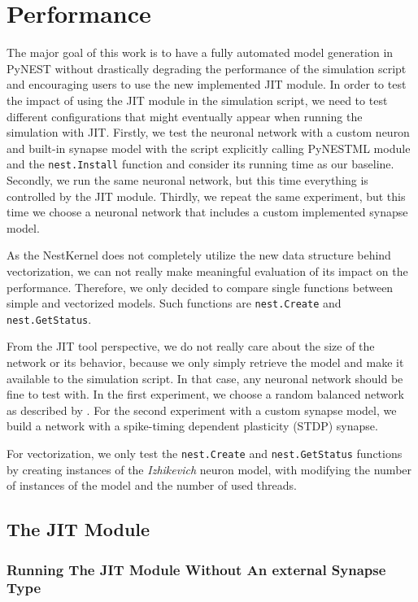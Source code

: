\chapter{Performance}
 \label{chap:perf}
 
 The major goal of this work is to have a fully automated model generation in PyNEST without drastically degrading the performance of the simulation script and encouraging users to use the new implemented JIT module. In order to test the impact of using the JIT module in the simulation script, we need to test different configurations that might eventually appear when running the simulation with JIT. Firstly, we test the neuronal network with a custom neuron and built-in synapse model with the script explicitly calling PyNESTML module and the \texttt{nest.Install} function and  consider its running time as our baseline. Secondly, we run the same neuronal network, but this time everything is controlled by the JIT module. Thirdly, we repeat the same experiment, but this time we choose a neuronal network that includes a custom implemented synapse model.
 
 As the NestKernel does not completely utilize the new data structure behind vectorization, we can not really make meaningful evaluation of its impact on the performance. Therefore, we only decided to compare single functions between simple and vectorized models. Such functions are \texttt{nest.Create} and \texttt{nest.GetStatus}.
 
 From the JIT tool perspective, we do not really care about the size of the network or its behavior, because we only simply retrieve the model and make it available to the simulation script. In that case, any neuronal network should be fine to test with. In the first experiment, we choose a random balanced network as  described by \citep{brunel2000dynamics}. For the second experiment with a custom synapse model, we build a network with a spike-timing dependent plasticity (STDP) synapse.
 
 
 For vectorization, we only test the \texttt{nest.Create} and \texttt{nest.GetStatus} functions by creating instances of the \emph{Izhikevich} \citep{1257420} neuron model, with modifying the number of instances of the model and the number of used threads.
 
\section{The JIT Module}

\subsection{Running The JIT Module Without An external Synapse Type}

